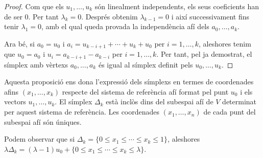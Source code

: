 \documentclass{article}
\theoremstyle{definition}
\begin{document}
\begin{proof}
Com que els $u_1,\ldots,u_k$ s\'{o}n linealment independents, els seus coeficients han de ser 0. Per tant $\lambda_k=0$. Despr\'{e}s obtenim $\lambda_{k-1}=0$ i aix\'{i} successivament fins tenir $\lambda_1=0$, amb el qual queda provada la independ\`{e}ncia af\'{i} dels $a_0,\ldots,a_k$.

Ara b\'{e}, si $a_0=u_0$ i $a_i=u_{k-i+1}+\cdots+u_k+u_0$ per $i=1,\ldots,k$, aleshores tenim que $u_0=a_0$ i $u_i=a_{k-i+1}-a_{k-i}$ per $i=1,\ldots,k$. Per tant, pel ja demostrat, el s\'{i}mplex amb v\`{e}rtexs $a_0,\ldots,a_k$ \'{e}s igual al s\'{i}mplex definit pels $u_0,\ldots,u_k$.
\end{proof}

Aquesta proposici\'{o} ens dona l'expressi\'{o} dels s\'{i}mplexs en termes de coordenades afins $(x_1,\ldots,x_k)$ respecte del sistema de refer\`{e}ncia af\'{i} format pel punt $u_0$ i els vectors $u_1,\ldots,u_k$. El s\'{i}mplex $\Delta_k$ est\`{a} incl\`{o}s dins del subespai af\'{i} de $V$ determinat per aquest sistema de refer\`{e}ncia. Les coordenades $(x_1,\ldots,x_n)$ de cada punt del subespai af\'{i} s\'{o}n \'{u}niques.

Podem observar que si $\Delta_k=\{0\leq x_1\leq\cdots\leq x_k\leq1\}$, aleshores $\lambda\Delta_k=(\lambda-1)u_0+\{0\leq x_1\leq\cdots\leq x_k\leq\lambda\}$.
\end{document}
